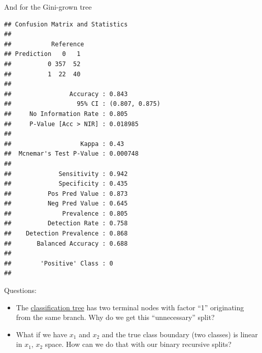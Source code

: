 \documentclass[ignorenonframetext,]{beamer}
\newenvironment{Shaded}{\begin{snugshade}}{\end{snugshade}}
\newcommand{\KeywordTok}[1]{\textcolor[rgb]{0.13,0.29,0.53}{\textbf{#1}}}
\newcommand{\DataTypeTok}[1]{\textcolor[rgb]{0.13,0.29,0.53}{#1}}
\newcommand{\StringTok}[1]{\textcolor[rgb]{0.31,0.60,0.02}{#1}}
\newcommand{\OperatorTok}[1]{\textcolor[rgb]{0.81,0.36,0.00}{\textbf{#1}}}
\newcommand{\NormalTok}[1]{#1}
\providecommand{\tightlist}{%
  \setlength{\itemsep}{0pt}\setlength{\parskip}{0pt}}
\begin{document}
\begin{frame}[fragile]

And for the Gini-grown tree

\footnotesize

\begin{Shaded}
\end{Shaded}

\begin{verbatim}
## Confusion Matrix and Statistics
## 
##           Reference
## Prediction   0   1
##          0 357  52
##          1  22  40
##                                         
##                Accuracy : 0.843         
##                  95% CI : (0.807, 0.875)
##     No Information Rate : 0.805         
##     P-Value [Acc > NIR] : 0.018985      
##                                         
##                   Kappa : 0.43          
##  Mcnemar's Test P-Value : 0.000748      
##                                         
##             Sensitivity : 0.942         
##             Specificity : 0.435         
##          Pos Pred Value : 0.873         
##          Neg Pred Value : 0.645         
##              Prevalence : 0.805         
##          Detection Rate : 0.758         
##    Detection Prevalence : 0.868         
##       Balanced Accuracy : 0.688         
##                                         
##        'Positive' Class : 0             
## 
\end{verbatim}

\normalsize

\end{frame}

\begin{frame}

\begin{block}{Questions:}

\begin{itemize}
\tightlist
\item
  The \protect\hyperlink{classtree2}{classification tree} has two
  terminal nodes with factor ``1'' originating from the same branch. Why
  do we get this ``unnecessary'' split?
\item
  What if we have \(x_1\) and \(x_2\) and the true class boundary (two
  classes) is linear in \(x_1\), \(x_2\) space. How can we do that with
  our binary recursive splits?
\end{itemize}

\end{block}

\end{frame}
\end{document}
